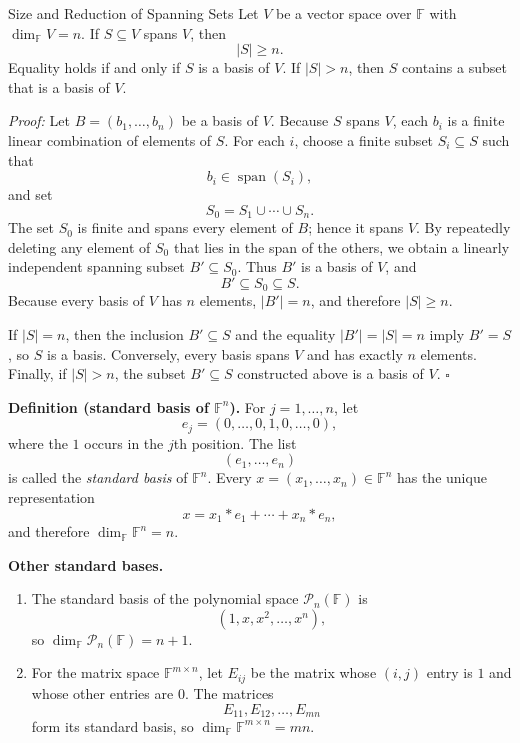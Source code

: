 \documentclass[a4paper,11pt,abstract=true]{scrartcl}
\theoremstyle{dotlessP}
\theoremstyle{dotlessS}
\theoremstyle{remark}
\theoremstyle{definition}
\begin{document}
\begin{mainbox}{Size and Reduction of Spanning Sets} 
Let $V$ be a vector
space over $\mathbb{F}$ with $\dim_{\mathbb{F}} V=n$. If $S\subseteq V$ spans $V$, then
\[
|S|\geq n.
\]
Equality holds if and only if $S$ is a basis of $V$. If $|S|>n$, then $S$
contains a subset that is a basis of $V$.
\end{mainbox}

\textit{Proof:} Let $B=(b_1,\ldots,b_n)$ be a basis of $V$. Because $S$
spans $V$, each $b_i$ is a finite linear combination of elements of $S$.
For each $i$, choose a finite subset $S_i\subseteq S$ such that
\[
b_i\in\operatorname{span}(S_i),
\]
and set
\[
S_0=S_1\cup\cdots\cup S_n.
\]
The set $S_0$ is finite and spans every element of $B$; hence it spans $V$.
By repeatedly deleting any element of $S_0$ that lies in the span of the
others, we obtain a linearly independent spanning subset $B'\subseteq S_0$.
Thus $B'$ is a basis of $V$, and
\[
B'\subseteq S_0\subseteq S.
\]
Because every basis of $V$ has $n$ elements, $|B'|=n$, and therefore
$|S|\geq n$.

If $|S|=n$, then the inclusion $B'\subseteq S$ and the equality
$|B'|=|S|=n$ imply $B'=S$, so $S$ is a basis. Conversely, every basis spans
$V$ and has exactly $n$ elements. Finally, if $|S|>n$, the subset
$B'\subseteq S$ constructed above is a basis of $V$. \hfill$\square$

\begin{definition_box}
\textbf{Definition (standard basis of $\mathbb{F}^n$).} For $j=1,\ldots,n$, let
\[
e_j=(0,\ldots,0,1,0,\ldots,0),
\]
where the $1$ occurs in the $j$th position. The list
\[
(e_1,\ldots,e_n)
\]
is called the \emph{standard basis} of $\mathbb{F}^n$. Every
$x=(x_1,\ldots,x_n)\in \mathbb{F}^n$ has the unique representation
\[
x=x_1*e_1+\cdots+x_n*e_n,
\]
and therefore $\dim_{\mathbb{F}} \mathbb{F}^n=n$.
\end{definition_box}

\begin{example_box}
\textbf{Other standard bases.}
\begin{enumerate}
    \item The standard basis of the polynomial space
    $\mathcal{P}_n(\mathbb{F})$ is
    \[
    (1,x,x^2,\ldots,x^n),
    \]
    so $\dim_{\mathbb{F}}\mathcal{P}_n(\mathbb{F})=n+1$.

    \item For the matrix space $\mathbb{F}^{m\times n}$, let $E_{ij}$ be the matrix
    whose $(i,j)$ entry is $1$ and whose other entries are $0$. The matrices
    \[
    E_{11},E_{12},\ldots,E_{mn}
    \]
    form its standard basis, so $\dim_{\mathbb{F}} \mathbb{F}^{m\times n}=mn$.
\end{enumerate}
\end{example_box}
\end{document}
